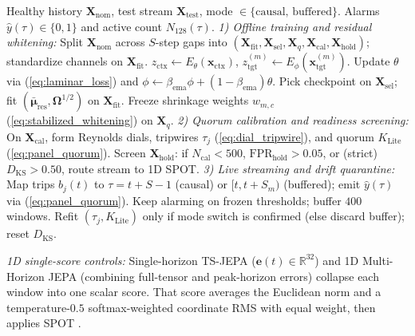 \documentclass[journal]{IEEEtran}
\begin{document}
\begin{algorithm}[t]
\caption{Laminar-JEPA-Lite, Screening, and Quarantine\label{alg:pipeline}}
\small
\begin{algorithmic}[1]
\Require Healthy history $\mathbf{X}_{\text{nom}}$, test stream $\mathbf{X}_{\text{test}}$, mode $\in\{\text{causal},\,\text{buffered}\}$.
\Ensure Alarms $\hat{y}(\tau)\in\{0,1\}$ and active count $N_{128}(\tau)$.
\Statex \textit{1) Offline training and residual whitening:}
\State Split $\mathbf{X}_{\text{nom}}$ across $S$-step gaps into $(\mathbf{X}_{\text{fit}}, \mathbf{X}_{\text{sel}}, \mathbf{X}_q, \mathbf{X}_{\text{cal}}, \mathbf{X}_{\text{hold}})$; standardize channels on $\mathbf{X}_{\text{fit}}$.
    \State $z_{\text{ctx}} \leftarrow E_\theta(\mathbf{x}_{\text{ctx}})$, \; $z_{\text{tgt}}^{(m)} \leftarrow E_\phi(\mathbf{x}_{\text{tgt}}^{(m)})$.
    \State Update $\theta$ via (\ref{eq:laminar_loss}) and $\phi \leftarrow \beta_{\text{ema}}\phi + (1{-}\beta_{\text{ema}})\theta$.
\EndFor
\State Pick checkpoint on $\mathbf{X}_{\text{sel}}$; fit $(\bar{\bm{\mu}}_{\text{res}}, \mathbf{\Omega}^{1/2})$ on $\mathbf{X}_{\text{fit}}$.
\State Freeze shrinkage weights $w_{m,c}$ (\ref{eq:stabilized_whitening}) on $\mathbf{X}_q$.
\Statex \textit{2) Quorum calibration and readiness screening:}
\State On $\mathbf{X}_{\text{cal}}$, form Reynolds dials, tripwires $\tau_j$ (\ref{eq:dial_tripwire}), and quorum $K_{\text{Lite}}$ (\ref{eq:panel_quorum}).
\State Screen $\mathbf{X}_{\text{hold}}$: if $N_{\text{cal}}{<}500$, $\text{FPR}_{\text{hold}}{>}0.05$, or (strict) $D_{\text{KS}}{>}0.50$, route stream to 1D SPOT.
\Statex \textit{3) Live streaming and drift quarantine:}
\For{each stride-$1$ window $[t{-}C,\,t{+}S)$ on $\mathbf{X}_{\text{test}}$}
    \State Map trips $b_j(t)$ to $\tau{=}t{+}S{-}1$ (causal) or $[t,t{+}S_m)$ (buffered); emit $\hat{y}(\tau)$ via (\ref{eq:panel_quorum}).
        \State Keep alarming on frozen thresholds; buffer $400$ windows.
        \State Refit $(\tau_j, K_{\text{Lite}})$ only if mode switch is confirmed (else discard buffer); reset $D_{\text{KS}}$.
    \EndIf
\EndFor
\end{algorithmic}
\end{algorithm}

\noindent\emph{1D single-score controls:} Single-horizon TS-JEPA ($\mathbf{e}(t) \in \mathbb{R}^{32}$) and 1D Multi-Horizon JEPA (combining full-tensor and peak-horizon errors) collapse each window into one scalar score. That score averages the Euclidean norm and a temperature-$0.5$ softmax-weighted coordinate RMS with equal weight, then applies SPOT \cite{siffer2017anomaly, balkema1974residual, grimshaw1993computing}.
\end{document}
